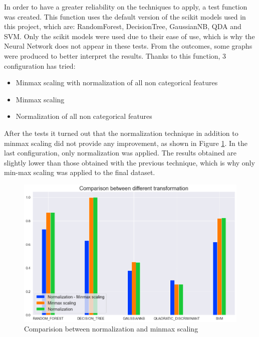 \documentclass[../main]{subfiles}
\begin{document}
In order to have a greater reliability on the techniques to apply, a test function was created.
This function uses the default version of the scikit models used in this project, which are: RandomForest, DecisionTree, GaussianNB, QDA and SVM.
Only the scikit models were used due to their ease of use, which is why the Neural Network does not appear in these tests.
From the outcomes, some graphs were produced to better interpret the results.
Thanks to this function, 3 configuration has tried:
\begin{itemize}
    \item Minmax scaling with normalization of all non categorical features
    \item Minmax scaling
    \item Normalization of all non categorical features
\end{itemize}

After the tests it turned out that the normalization technique in addition to minmax scaling did not provide any improvement, as shown in Figure \ref{fig:plot_data_transformation}.
In the last configuration, only normalization was applied.
The results obtained are slightly lower than those obtained with the previous technique, which is why only min-max scaling was applied to the final dataset.
\begin{figure}[htb]
    \begin{center}
        \includegraphics[width=0.75\linewidth]{figures/data_transformation.png}
    \end{center}
    
    \caption{Comparision between normalization and minmax scaling}
    \label{fig:plot_data_transformation}
\end{figure}

\end{document}
